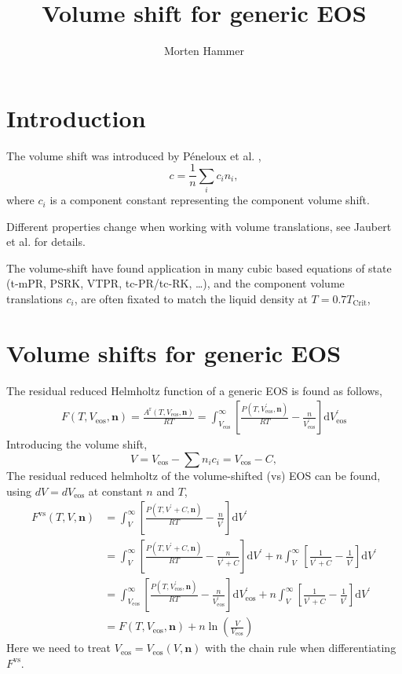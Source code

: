 \documentclass[english]{../thermomemo/thermomemo}
\title{Volume shift for generic EOS}
\author{Morten Hammer}
\newcommand*{\vektor}[1]{\boldsymbol{#1}}%
\newcommand{\dd}[1]{\mathrm{d}{#1}}
\newcommand{\eos}{\ensuremath{\text{eos}}\xspace}
\begin{document}
\frontmatter


\section{Introduction}
The volume shift was introduced by P{\'e}neloux et al. \cite{Peneloux1982},
\begin{equation}
  c = \frac{1}{n}\underset{i}{\sum}c_i n_i,
\label{eq:volumeshift}
\end{equation}
where $c_i$ is a component constant representing the component volume
shift.

Different properties change when working with volume translations, see
Jaubert et al. \cite{Jaubert2016} for details.

The volume-shift have found application in many cubic based equations
of state (t-mPR\cite{Kordas1995}, PSRK\cite{Fischer1996},
VTPR\cite{Collinet2006}, tc-PR/tc-RK\cite{LeGuennec2016}, \dots), and
the component volume translations $c_i$, are often fixated to match the
liquid density at $T=0.7T_{\text{Crit}}$,
\section{Volume shifts for generic EOS}

The residual reduced Helmholtz function of a  generic EOS is found as follows,
\begin{align}
  F(T,V_{\eos},\vektor{n}) = \frac{A^\text{r}(T,V_{\eos},\vektor{n})}{RT}
  = \int^\infty_{V_{\eos}} \left[ \frac{P(T,V_{\eos}^\prime,\vektor{n})}{RT} - \frac{n}{V_{\eos}^\prime} \right]\dd{V_{\eos}^\prime}
  \label{eq:helmholtz_int_eos}
\end{align}
Introducing the volume shift,
\begin{equation}
V = V_{\eos}- \sum n_ic_i = V_{\eos}- C,
\label{eq:v_shift}
\end{equation}
The residual reduced helmholtz of the volume-shifted (vs) EOS can be
found, using $dV = dV_{\eos}$ at constant $n$ and $T$,
\begin{align}
  F^{\text{vs}}(T,V,\vektor{n})
  &= \int^\infty_V \left[ \frac{P(T,V^\prime+C,\vektor{n})}{RT} - \frac{n}{V^\prime} \right]\dd{V^\prime} \\ &= \int^\infty_V \left[ \frac{P(T,V^\prime+C,\vektor{n})}{RT} - \frac{n}{V^\prime + C} \right]\dd{V^\prime} + n\int^\infty_V \left[\frac{1}{V^\prime + C}  - \frac{1}{V^\prime} \right]\dd{V^\prime}\\ &= \int^\infty_{V_{\eos}} \left[ \frac{P(T,V_{\eos}^\prime,\vektor{n})}{RT} - \frac{n}{V_{\eos}^\prime} \right]\dd{V_{\eos}^\prime} + n\int^\infty_V \left[\frac{1}{V^\prime + C}  - \frac{1}{V^\prime} \right]\dd{V^\prime}\\ &= F(T,V_{\eos},\vektor{n})  + n \ln \left(\frac{V}{V_{\eos}} \right)
  \label{eq:helmholtz_int}
\end{align}
Here we need to treat $V_{\eos} = V_{\eos}(V,\vektor{n})$ with the
chain rule when differentiating $F^{\text{vs}}$.
\end{document}
